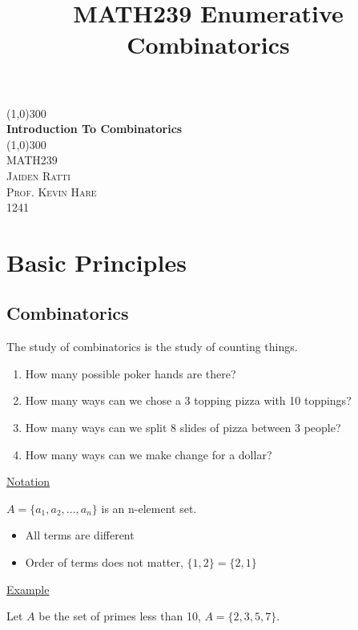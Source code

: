 \documentclass{article}
\title{MATH239 Enumerative Combinatorics}
\begin{document}
\begin{titlepage}
	\begin{center}
    \line(1,0){300}\\
    [0.65cm]
	\huge{\bfseries Introduction To Combinatorics}\\
	\line(1,0){300}\\
	\textsc{\Large MATH239}\\
	\textsc{\LARGE  Jaiden Ratti}\\
        \textsc{\Large Prof. Kevin Hare}\\
        \Large 1241\\
	[5.5cm]
	\end{center}
\end{titlepage}




\tableofcontents

\pagebreak

\section{Basic Principles}

\subsection{Combinatorics}

The study of combinatorics is the study of counting things. 

\begin{enumerate}
    \item How many possible poker hands are there?
    \item How many ways can we chose a 3 topping pizza with 10 toppings?
    \item How many ways can we split 8 slides of pizza between 3 people?
    \item How many ways can we make change for a dollar?
\end{enumerate}

\underline{Notation}

$A = \{a_1, a_2, ..., a_n\}$ is an n-element set. 
\begin{itemize}
    \item All terms are different
    \item Order of terms does not matter, $\{1,2\} = \{2,1\}$
\end{itemize}

\underline{Example}

Let $A$ be the set of primes less than 10, $A = \{2,3,5,7\}$. 
\end{document}
